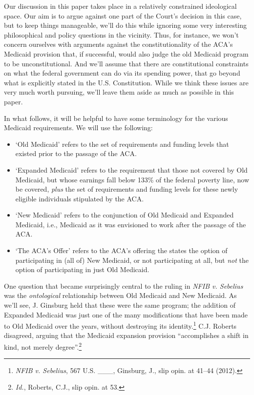\documentclass[
  11pt,
  letterpaper,
  DIV=11,
  numbers=noendperiod,
  twoside]{scrartcl}
\providecommand{\tightlist}{%
  \setlength{\itemsep}{0pt}\setlength{\parskip}{0pt}}
\begin{document}
Our discussion in this paper takes place in a relatively constrained
ideological space. Our aim is to argue against one part of the Court's
decision in this case, but to keep things manageable, we'll do this
while ignoring some very interesting philosophical and policy questions
in the vicinity. Thus, for instance, we won't concern ourselves with
arguments against the constitutionality of the ACA's Medicaid provision
that, if successful, would also judge the old Medicaid program to be
unconstitutional. And we'll assume that there are constitutional
constraints on what the federal government can do via its spending
power, that go beyond what is explicitly stated in the U.S.
Constitution. While we think these issues are very much worth pursuing,
we'll leave them aside as much as possible in this paper.

In what follows, it will be helpful to have some terminology for the
various Medicaid requirements. We will use the following:

\begin{itemize}
\tightlist
\item
  `Old Medicaid' refers to the set of requirements and funding levels
  that existed prior to the passage of the ACA.
\item
  `Expanded Medicaid' refers to the requirement that those not covered
  by Old Medicaid, but whose earnings fall below 133\% of the federal
  poverty line, now be covered, \emph{plus} the set of requirements and
  funding levels for these newly eligible individuals stipulated by the
  ACA.
\item
  `New Medicaid' refers to the conjunction of Old Medicaid and Expanded
  Medicaid, i.e., Medicaid as it was envisioned to work after the
  passage of the ACA.
\item
  `The ACA's Offer' refers to the ACA's offering the states the option
  of participating in (all of) New Medicaid, or not participating at
  all, but \emph{not} the option of participating in just Old Medicaid.
\end{itemize}

One question that became surprisingly central to the ruling in
\emph{NFIB v. Sebelius} was the \emph{ontological} relationship between
Old Medicaid and New Medicaid. As we'll see, J. Ginsburg held that these
were the same program; the addition of Expanded Medicaid was just one of
the many modifications that have been made to Old Medicaid over the
years, without destroying its identity.\footnote{\emph{NFIB v.
  Sebelius}, 567 U.S. \_\_\_, Ginsburg, J., slip opin. at 41--44 (2012).}
C.J. Roberts disagreed, arguing that the Medicaid expansion provision
``accomplishes a shift in kind, not merely degree''.\footnote{\emph{Id.},
  Roberts, C.J., slip opin. at 53.}
\end{document}
